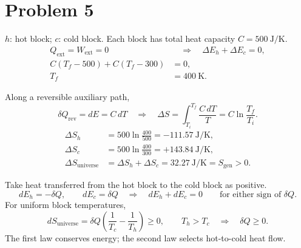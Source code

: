 \section*{Problem 5}

$h$: hot block; $c$: cold block. Each block has total heat capacity
$C=500~\mathrm{J/K}$.
\begin{align*}
Q_{\mathrm{ext}}=W_{\mathrm{ext}}=0
&\quad\Longrightarrow\quad \Delta E_h+\Delta E_c=0,\\
C(T_f-500)+C(T_f-300)&=0,\\
T_f&=\boxed{400~\mathrm{K}}.
\end{align*}

Along a reversible auxiliary path,
\[
\delta Q_{\mathrm{rev}}=dE=C\,dT
\quad\Longrightarrow\quad
\Delta S=\int_{T_i}^{T_f}\frac{C\,dT}{T}
=C\ln\frac{T_f}{T_i}.
\]
\begin{align*}
\Delta S_h&=500\ln\frac{400}{500}
=\boxed{-111.57~\mathrm{J/K}},\\
\Delta S_c&=500\ln\frac{400}{300}
=\boxed{+143.84~\mathrm{J/K}},\\
\Delta S_{\mathrm{universe}}
&=\Delta S_h+\Delta S_c
=\boxed{32.27~\mathrm{J/K}}=S_{\mathrm{gen}}>0.
\end{align*}

Take heat transferred from the hot block to the cold block as positive.
\[
dE_h=-\delta Q,\qquad dE_c=\delta Q
\quad\Longrightarrow\quad dE_h+dE_c=0
\qquad\text{for either sign of }\delta Q.
\]
For uniform block temperatures,
\[
dS_{\mathrm{universe}}
=\delta Q\left(\frac{1}{T_c}-\frac{1}{T_h}\right)\ge0,
\qquad T_h>T_c
\quad\Longrightarrow\quad \delta Q\ge0.
\]
The first law conserves energy; the second law selects hot-to-cold heat flow.
